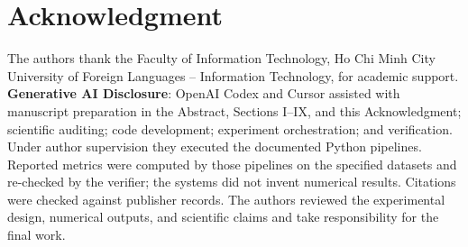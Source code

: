 \documentclass[conference,a4paper]{IEEEtran}
\begin{document}
\section*{Acknowledgment}
The authors thank the Faculty of Information Technology, Ho Chi Minh City University of Foreign Languages -- Information Technology, for academic support.
\textbf{Generative AI Disclosure}: OpenAI Codex and Cursor assisted with manuscript preparation in the Abstract, Sections I--IX, and this Acknowledgment; scientific auditing; code development; experiment orchestration; and verification. Under author supervision they executed the documented Python pipelines. Reported metrics were computed by those pipelines on the specified datasets and re-checked by the verifier; the systems did not invent numerical results. Citations were checked against publisher records. The authors reviewed the experimental design, numerical outputs, and scientific claims and take responsibility for the final work.
\end{document}
